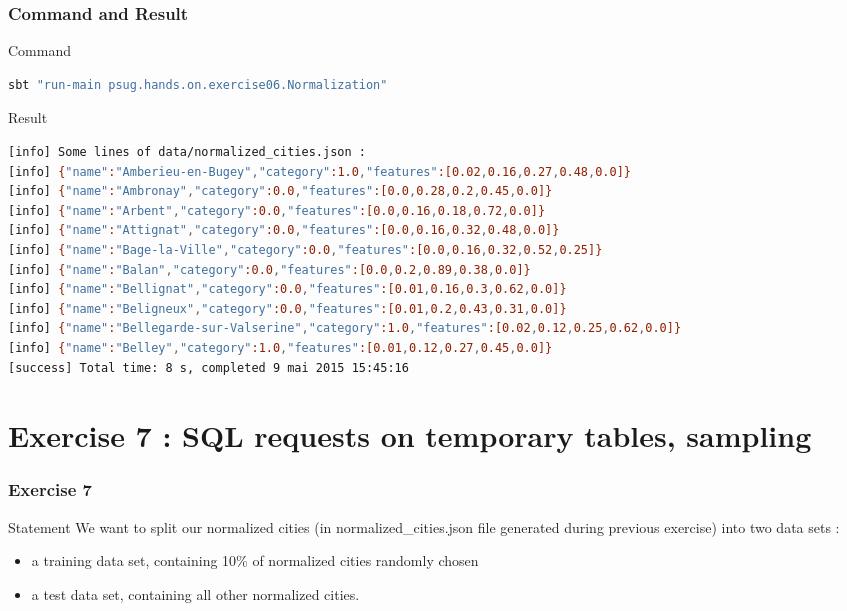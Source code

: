 \documentclass[slidetop,9pt,utf8]{beamer}
\begin{document}
\begin{CJK}{UTF8}{gbsn}
\begin{frame}[fragile]
\end{frame}

\begin{frame}[fragile]
  \frametitle{Command and Result}

  \begin{block}{Command}
    \begin{lstlisting}[language=bash, style=terminal]
sbt "run-main psug.hands.on.exercise06.Normalization"  
    \end{lstlisting}
  \end{block}

  \begin{block}{Result}
    \begin{lstlisting}[language=bash, style=terminal]
[info] Some lines of data/normalized_cities.json : 
[info] {"name":"Amberieu-en-Bugey","category":1.0,"features":[0.02,0.16,0.27,0.48,0.0]}
[info] {"name":"Ambronay","category":0.0,"features":[0.0,0.28,0.2,0.45,0.0]}
[info] {"name":"Arbent","category":0.0,"features":[0.0,0.16,0.18,0.72,0.0]}
[info] {"name":"Attignat","category":0.0,"features":[0.0,0.16,0.32,0.48,0.0]}
[info] {"name":"Bage-la-Ville","category":0.0,"features":[0.0,0.16,0.32,0.52,0.25]}
[info] {"name":"Balan","category":0.0,"features":[0.0,0.2,0.89,0.38,0.0]}
[info] {"name":"Bellignat","category":0.0,"features":[0.01,0.16,0.3,0.62,0.0]}
[info] {"name":"Beligneux","category":0.0,"features":[0.01,0.2,0.43,0.31,0.0]}
[info] {"name":"Bellegarde-sur-Valserine","category":1.0,"features":[0.02,0.12,0.25,0.62,0.0]}
[info] {"name":"Belley","category":1.0,"features":[0.01,0.12,0.27,0.45,0.0]}
[success] Total time: 8 s, completed 9 mai 2015 15:45:16
    \end{lstlisting}
  \end{block}

\end{frame}

\section{Exercise 7 : SQL requests on temporary tables, sampling}

\begin{frame}
  \frametitle{Exercise 7}

  \begin{block}{Statement}
    We want to split our normalized cities (in normalized\_cities.json file generated during previous exercise) into two data sets : 
    \begin{itemize}
      \item a training data set, containing 10\% of normalized cities randomly chosen
      \item a test data set, containing all other normalized cities. 
    \end{itemize}
    

\end{block}
\end{frame}
\end{CJK}
\end{document}
